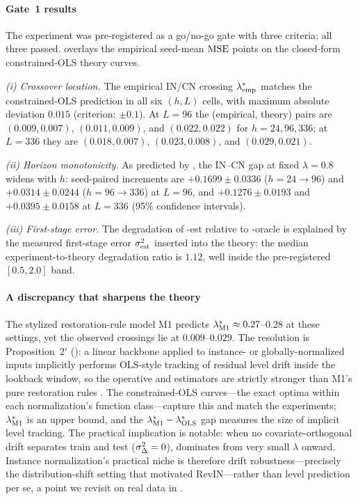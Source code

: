 \paragraph{Gate~1 results}
The experiment was pre-registered as a go/no-go gate with three criteria; all three passed.  overlays the empirical seed-mean $\mathrm{MSE}$ points on the closed-form constrained-OLS theory curves.

\emph{(i) Crossover location.} The empirical IN/CN crossing $\lambda^{*}_{\mathrm{emp}}$ matches the constrained-OLS prediction in all six $(h,L)$ cells, with maximum absolute deviation $0.015$ (criterion: $\pm 0.1$). At $L=96$ the (empirical, theory) pairs are $(0.009, 0.007)$, $(0.011, 0.009)$, and $(0.022, 0.022)$ for $h = 24, 96, 336$; at $L=336$ they are $(0.018, 0.007)$, $(0.023, 0.008)$, and $(0.029, 0.021)$.

\emph{(ii) Horizon monotonicity.} As predicted by , the IN--CN gap at fixed $\lambda = 0.8$ widens with $h$: seed-paired increments are $+0.1699 \pm 0.0336$ ($h{=}24 \to 96$) and $+0.0314 \pm 0.0244$ ($h{=}96 \to 336$) at $L=96$, and $+0.1276 \pm 0.0193$ and $+0.0395 \pm 0.0158$ at $L=336$ (95\% confidence intervals).

\emph{(iii) First-stage error.} The degradation of \cnm-est relative to \cnm-oracle is explained by the measured first-stage error $\sigma_{\mathrm{est}}^2$ inserted into the theory: the median experiment-to-theory degradation ratio is $1.12$, well inside the pre-registered $[0.5, 2.0]$ band.

\paragraph{A discrepancy that sharpens the theory}
The stylized restoration-rule model M1 predicts $\lambda^{*}_{\mathrm{M1}} \approx 0.27$--$0.28$ at these settings, yet the observed crossings lie at $0.009$--$0.029$. The resolution is Proposition~2$'$ (): a linear backbone applied to instance- or globally-normalized inputs implicitly performs OLS-style tracking of residual level drift inside the lookback window, so the operative \rawm{} and \cnm{} estimators are strictly stronger than M1's pure restoration rules \citep{toner2024linear}. The constrained-OLS curves---the exact optima within each normalization's function class---capture this and match the experiments; $\lambda^{*}_{\mathrm{M1}}$ is an upper bound, and the $\lambda^{*}_{\mathrm{M1}} - \lambda^{*}_{\mathrm{OLS}}$ gap measures the size of implicit level tracking. The practical implication is notable: when no covariate-orthogonal drift separates train and test ($\sigma_\Delta^2 = 0$), \cnm{} dominates from very small $\lambda$ onward. Instance normalization's practical niche is therefore drift robustness---precisely the distribution-shift setting that motivated RevIN---rather than level prediction per se, a point we revisit on real data in .

